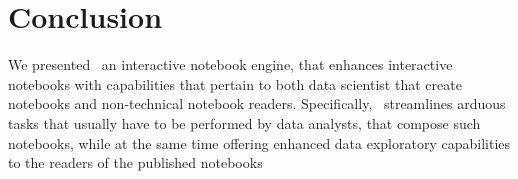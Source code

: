

\section{Conclusion}
\label{section:conclusion}

We presented \projname\ an interactive notebook engine, that enhances interactive notebooks with capabilities that pertain to both data scientist that create notebooks and non-technical notebook readers. Specifically, \projname\ streamlines arduous tasks that usually have to be performed by data analysts, that compose such notebooks, while at the same time offering enhanced data exploratory capabilities to the readers of the published notebooks